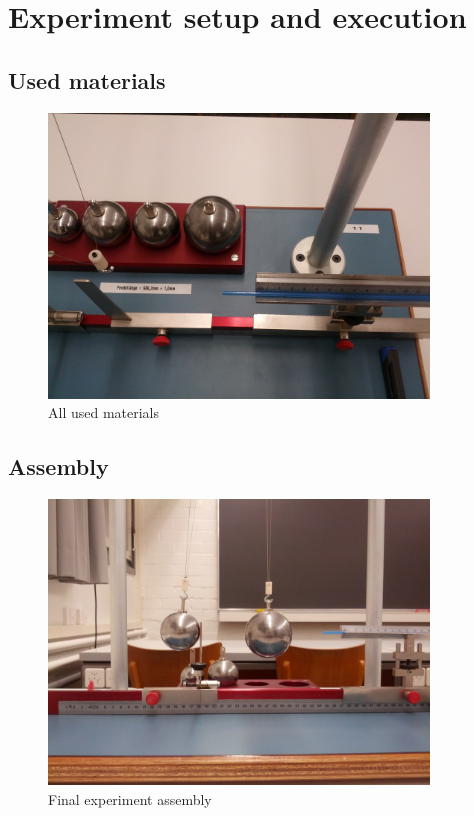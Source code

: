 \documentclass{scrreprt}
\begin{document}
\section{Experiment setup and execution}

\subsection{Used materials}
\begin{figure}[H]
	\centering
  \includegraphics[width=0.9\textwidth]{img/topview.jpg}
	\caption{All used materials}
	\label{fig:materials}
\end{figure}

\subsection{Assembly}
\begin{figure}[H]
	\centering
  \includegraphics[width=0.9\textwidth]{img/assembly.jpg}
	\caption{Final experiment assembly}
	\label{fig:assembly}
\end{figure}
\end{document}
